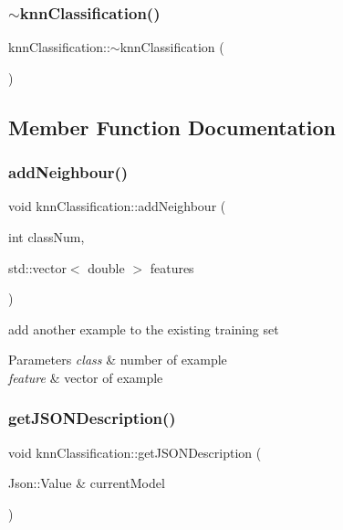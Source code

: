 \subsubsection{\texorpdfstring{$\sim$knn\+Classification()}{~knnClassification()}}
{\footnotesize\ttfamily knn\+Classification\+::$\sim$knn\+Classification (\begin{DoxyParamCaption}{ }\end{DoxyParamCaption})}



\subsection{Member Function Documentation}
\mbox{\label{classknn_classification_a591f953b182fed995ebfb13c712b76d5}} 
\subsubsection{\texorpdfstring{add\+Neighbour()}{addNeighbour()}}
{\footnotesize\ttfamily void knn\+Classification\+::add\+Neighbour (\begin{DoxyParamCaption}\item[{int}]{class\+Num,  }\item[{std\+::vector$<$ double $>$}]{features }\end{DoxyParamCaption})}

add another example to the existing training set 
\begin{DoxyParams}{Parameters}
{\em class} & number of example \\
\hline
{\em feature} & vector of example \\
\hline
\end{DoxyParams}
\mbox{\label{classknn_classification_a456b4b1b0fedb8f8fbe6d810bd80ceb8}} 
\subsubsection{\texorpdfstring{get\+J\+S\+O\+N\+Description()}{getJSONDescription()}}
{\footnotesize\ttfamily void knn\+Classification\+::get\+J\+S\+O\+N\+Description (\begin{DoxyParamCaption}\item[{Json\+::\+Value \&}]{current\+Model }\end{DoxyParamCaption})\hspace{0.3cm}{\ttfamily [virtual]}}




